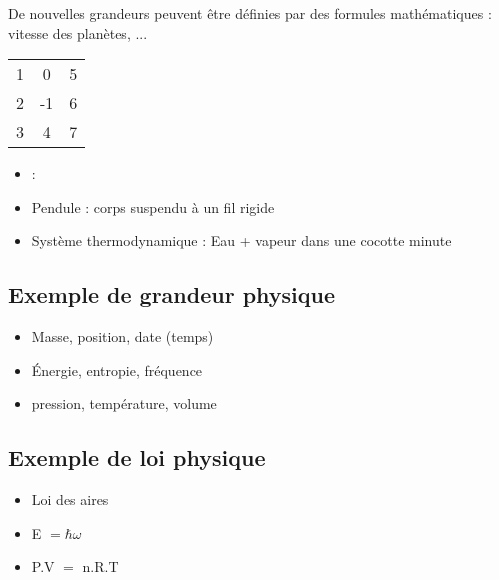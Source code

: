 De nouvelles grandeurs peuvent être définies par des formules mathématiques : vitesse des planètes, ...

\begin{tabular}{ c c c }
 1 & 0 & 5 \\ 2 & -1 & 6 \\ 3 & 4 & 7 \\
\end{tabular}

	\begin{itemize}[leftmargin=1cm, label=, itemsep=1pt]
		\item  :
		\item Pendule : corps suspendu à un fil rigide
		\item Système thermodynamique : Eau + vapeur dans une cocotte minute
	\end{itemize}
\subsection{Exemple de grandeur physique}
	\begin{itemize}[leftmargin=1cm, label=, itemsep=1pt]
		\item Masse, position, date (temps)
		\item Énergie, entropie, fréquence
		\item pression, température, volume
	\end{itemize}
\subsection{Exemple de loi physique}
	\begin{itemize}[leftmargin=1cm, label=, itemsep=1pt]
		\item Loi des aires
		\item E $=\hbar\omega$
		\item P.V $=$ n.R.T
	\end{itemize}





